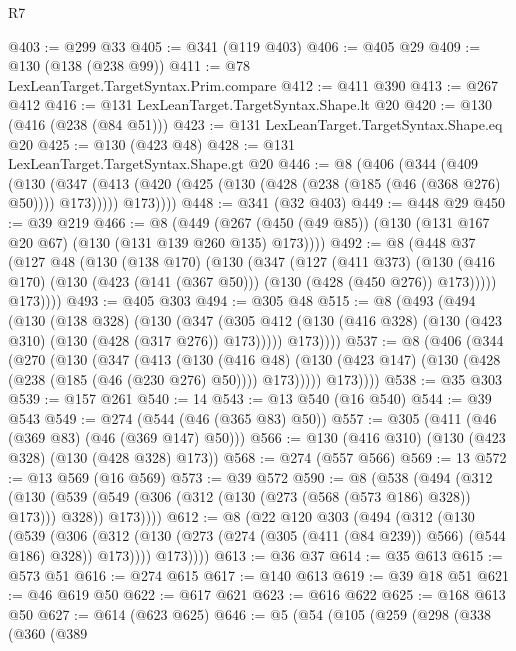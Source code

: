 \begin{lexlean}{R7}
\begin{coremodule}
{{{{{{{{{{{{{{{{{{{{@403 := @299 @33
@405 := @341 (@119 @403)
@406 := @405 @29
@409 := @130 (@138 (@238 @99))
@411 := @78 LexLeanTarget.TargetSyntax.Prim.compare
@412 := @411 @390
@413 := @267 @412
@416 := @131 LexLeanTarget.TargetSyntax.Shape.lt @20
@420 := @130 (@416 (@238 (@84 @51)))
@423 := @131 LexLeanTarget.TargetSyntax.Shape.eq @20
@425 := @130 (@423 @48)
@428 := @131 LexLeanTarget.TargetSyntax.Shape.gt @20
@446 := @8
    (@406
      (@344
        (@409
          (@130
            (@347 (@413 (@420 (@425 (@130 (@428 (@238 (@185 (@46 (@368 @276) @50)))) @173)))))
            @173))))
@448 := @341 (@32 @403)
@449 := @448 @29
@450 := @39 @219
@466 := @8
    (@449 (@267 (@450 (@49 @85)) (@130 (@131 @167 @20 @67) (@130 (@131 @139 @260 @135) @173))))
@492 := @8
    (@448
      @37
      (@127
        @48
        (@130
          (@138 @170)
          (@130
            (@347
              (@127
                (@411 @373)
                (@130 (@416 @170) (@130 (@423 (@141 (@367 @50))) (@130 (@428 (@450 @276)) @173)))))
            @173))))
@493 := @405 @303
@494 := @305 @48
@515 := @8
    (@493
      (@494
        (@130
          (@138 @328)
          (@130
            (@347 (@305 @412 (@130 (@416 @328) (@130 (@423 @310) (@130 (@428 (@317 @276)) @173)))))
            @173))))
@537 := @8
    (@406
      (@344
        (@270
          (@130
            (@347
              (@413
                (@130
                  (@416 @48)
                  (@130 (@423 @147) (@130 (@428 (@238 (@185 (@46 (@230 @276) @50)))) @173)))))
            @173))))
@538 := @35 @303
@539 := @157 @261
@540 := 14
@543 := @13 @540 (@16 @540)
@544 := @39 @543
@549 := @274 (@544 (@46 (@365 @83) @50))
@557 := @305 (@411 (@46 (@369 @83) (@46 (@369 @147) @50)))
@566 := @130 (@416 @310) (@130 (@423 @328) (@130 (@428 @328) @173))
@568 := @274 (@557 @566)
@569 := 13
@572 := @13 @569 (@16 @569)
@573 := @39 @572
@590 := @8
    (@538
      (@494
        (@312
          (@130 (@539 (@549 (@306 (@312 (@130 (@273 (@568 (@573 @186) @328)) @173))) @328)) @173))))
@612 := @8
    (@22
      @120
      @303
      (@494
        (@312
          (@130
            (@539
              (@306
                (@312 (@130 (@273 (@274 (@305 (@411 (@84 @239)) @566) (@544 @186) @328)) @173))))
            @173))))
@613 := @36 @37
@614 := @35 @613
@615 := @573 @51
@616 := @274 @615
@617 := @140 @613
@619 := @39 @18 @51
@621 := @46 @619 @50
@622 := @617 @621
@623 := @616 @622
@625 := @168 @613 @50
@627 := @614 (@623 @625)
@646 := @5
    (@54
      (@105
        (@259
          (@298
            (@338
              (@360
                (@389
}}}}}}}}}}}}}}}}}}}}
\end{coremodule}
\end{lexlean}
